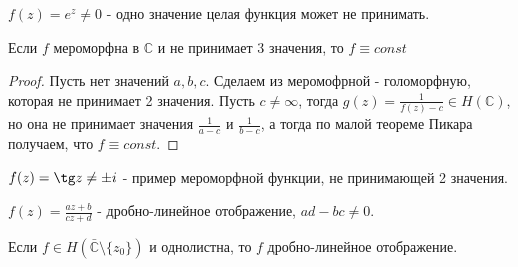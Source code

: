 \begin{example}
    $f(z) = e^z \neq 0$ - одно значение целая функция может не принимать.
\end{example}

\begin{consequence}
    Если $f$ мероморфна в $\mathbb{C}$ и не принимает 3 значения, то $f \equiv const$
\end{consequence}

\begin{proof}
    Пусть нет значений $a, b, c$. Сделаем из меромофрной - голоморфную, которая не принимает 2 значения.
    Пусть $c \neq \infty$, тогда $g(z) = \frac{1}{f(z) - c} \in H(\mathbb{C})$, но она не
    принимает значения $\frac{1}{a - c}$ и $\frac{1}{b - c}$, а тогда по малой теореме Пикара получаем, что $f \equiv const$.
\end{proof}

\begin{example}
    $f(z) = \tg z \neq \pm i$ - пример мероморфной функции, не принимающей 2 значения.
\end{example}

\begin{definition}
    $f(z) = \frac{az + b}{cz + d}$ - дробно-линейное отображение, $ad - bc \neq 0$.
\end{definition}

\begin{theorem}
    Если $f \in H(\bar{\mathbb{C}} \setminus \{z_0\})$ и однолистна, то $f$ дробно-линейное отображение.
\end{theorem}

